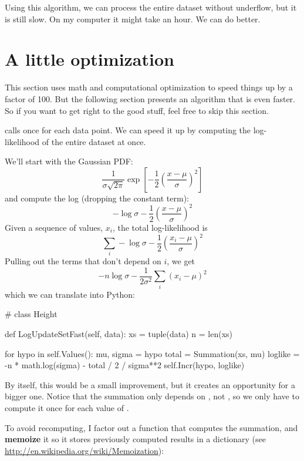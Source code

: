 \documentclass[12pt]{book}
\theoremstyle{exercise}
\begin{document}
Using this algorithm, we can process the entire dataset without
underflow, but it is still slow.  On my computer it might
take an hour.  We can do better.


\section{A little optimization}

This section uses math and computational optimization
to speed things up by a factor of 100.  But the following section
presents an algorithm that is even faster.  So if you want to
get right to the good stuff, feel free to skip this section.

 calls  once for each data
point.  We can speed it up by computing the log-likelihood of the entire
dataset at once.

We'll start with the Gaussian PDF:
%
\[ \frac{1}{\sigma \sqrt{2 \pi}} \exp \left[ -\frac{1}{2} \left( \frac{x-\mu}{\sigma} \right)^2 \right] \]
%
and compute the log (dropping the constant term):
%
\[ -\log \sigma -\frac{1}{2} \left( \frac{x-\mu}{\sigma} \right)^2 \]
%
Given a sequence of values, $x_i$, the total log-likelihood is
%
\[ \sum_i -\log \sigma - \frac{1}{2} \left( \frac{x_i-\mu}{\sigma} \right)^2 \]
%
Pulling out the terms that don't depend on $i$, we get
%
\[ -n \log \sigma - \frac{1}{2 \sigma^2} \sum_i (x_i - \mu)^2 \]
%
which we can translate into Python:

\begin{code}
# class Height

    def LogUpdateSetFast(self, data):
        xs = tuple(data)
        n = len(xs)

        for hypo in self.Values():
            mu, sigma = hypo
            total = Summation(xs, mu)
            loglike = -n * math.log(sigma) - total / 2 / sigma**2
            self.Incr(hypo, loglike)
\end{code}

By itself, this would be a small improvement, but it
creates an opportunity for a bigger one.  Notice that the
summation only depends on , not , so we only
have to compute it once for each value of .

To avoid recomputing, I factor out a function that computes the
summation, and {\bf memoize} it so it stores previously computed
results in a dictionary (see
\url{http://en.wikipedia.org/wiki/Memoization}): 
\end{document}
